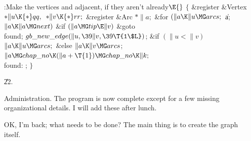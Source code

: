\B{}:Make the vertices  and  adjacent,
if they aren't already\X${}\E{}$\6
${}\{{}$\5
\1\&{register} \&{Vertex} ${}{*}\|u\K{*}\\{qq},{}$ ${}{*}\|v\K{*}\\{rr};{}$\6
\&{register} \&{Arc} ${}{*}\|a;{}$\7
\&{for} ${}(\|a\K\|u\MG\\{arcs};{}$ \|a; ${}\|a\K\|a\MG\\{next}){}$\1\6
\&{if} ${}(\|a\MG\\{tip}\E\|v){}$\1\5
\&{goto} \\{found};\2\2\6
${}\\{gb\_new\_edge}(\|u,\39\|v,\39\T{1\$L}){}$;\6
\&{if} ${}(\|u<\|v){}$\1\5
${}\|a\K\|u\MG\\{arcs};{}$\2\6
\&{else}\1\5
${}\|a\K\|v\MG\\{arcs}{}$;\2\6
${}\|a\MG\\{chap\_no}\K(\|a+\T{1})\MG\\{chap\_no}\K\|k;{}$\6
\4\\{found}:\5
;\6
\4${}\}{}$\2\par
\U22.\fi

Administration.
The program is now complete except for a few missing organizational details.
I will add these after lunch.

\fi

OK, I'm back; what needs to be done? The main thing is to create
the graph itself.

